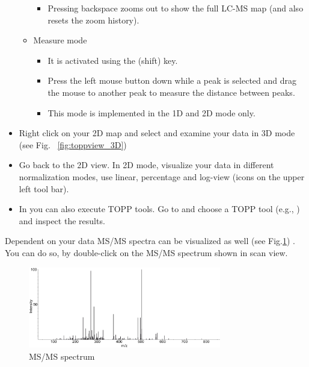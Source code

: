 \begin{itemize}
\begin{itemize}
\begin{itemize}
        \item Pressing backspace \keys{\, \backspace \,\,} zooms out to show the full LC-MS map (and also resets the zoom history).
        \end{itemize}
    \item Measure mode
        \begin{itemize}
        \item It is activated using the \keys{\, \shift \,\,\, } (shift) key.
        \item Press the left mouse button down while a peak is selected and drag the mouse to
        			another peak to measure the distance between peaks.
        \item This mode is implemented in the 1D and 2D mode only.
        \end{itemize}
    \end{itemize}
\item Right click on your 2D map and select  and examine your
			data in 3D mode (see Fig. ~\ref{fig:toppview_3D})
\item Go back to the 2D view. In 2D mode, visualize your data in different normalization modes, use linear, percentage and log-view (icons on the upper left tool bar).
\item In  you can also execute TOPP tools. Go to
			 and choose a TOPP tool (e.g., ) and
			inspect the results.
\end{itemize}

\noindent Dependent on your data MS/MS spectra can be visualized as well (see Fig.\ref{fig:ms2}) . You can do so, by double-click on the MS/MS spectrum shown in scan view.
\newline
\begin{figure}[!htb]
\includegraphics[width=0.75\textwidth]{graphics/introduction/ms2_introduction.png}
\caption{MS/MS spectrum}
\label{fig:ms2}
\end{figure}


